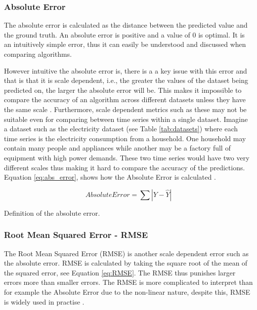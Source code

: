 \subsubsection{Absolute Error}
The absolute error is calculated as the distance between the predicted value and the ground truth. An absolute error is positive and a value of 0 is optimal. It is an intuitively simple error, thus it can easily be understood and discussed when comparing algorithms.

However intuitive the absolute error is, there is a a key issue with this error and that is that it is scale dependent, i.e., the greater the values of the dataset being predicted on, the larger the absolute error will be. This makes it impossible to compare the accuracy of an algorithm across different datasets unless they have the same scale \cite{hyndman_forecasting_3rd}. Furthermore, scale dependent metrics such as these may not be suitable even for comparing between time series within a single dataset. Imagine a dataset such as the electricity dataset (see Table \ref{tab:datasets}) where each time series is the electricity consumption from a household. One household may contain many people and appliances while another may be a factory full of equipment with high power demands. These two time series would have two very different scales thus making it hard to compare the accuracy of the predictions. Equation \ref{eq:abs_error}, shows how the Absolute Error is calculated \cite{gluonts-github}.

\begin{eqfloat}
  \begin{equation}
    Absolute Error = \sum|Y - \hat{Y}|
    \label{eq:abs_error}
  \end{equation}
  \caption{Definition of the absolute error.}
\end{eqfloat}

\subsubsection{Root Mean Squared Error - RMSE}
\label{sec:RMSE}
The Root Mean Squared Error (RMSE) is another scale dependent error such as the absolute error. RMSE is calculated by taking the square root of the mean of the squared error, see Equation \ref{eq:RMSE}. The RMSE thus punishes larger errors more than smaller errors. The RMSE is more complicated to interpret than for example the Absolute Error due to the non-linear nature, despite this, RMSE is widely used in practise \cite{hyndman_forecasting_3rd,gluonts-github}.


